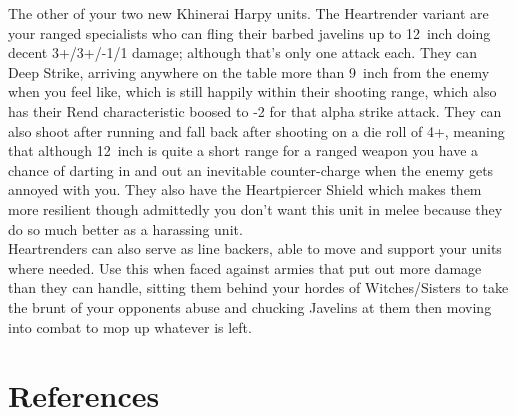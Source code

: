 The other of your two new Khinerai Harpy units. The Heartrender variant are
your ranged specialists who can fling their barbed javelins up to 12~inch doing
decent 3+/3+/-1/1 damage; although that's only one attack each.  They can Deep
Strike, arriving anywhere on the table more than 9~inch from the enemy when you
feel like, which is still happily within their shooting range, which also has
their Rend characteristic boosed to -2 for that alpha strike attack.  They can
also shoot after running and fall back after shooting on a die roll of 4+,
meaning that although 12~inch is quite a short range for a ranged weapon you
have a chance of darting in and out an inevitable counter-charge when the enemy
gets annoyed with you. They also have the Heartpiercer Shield which makes them
more resilient though admittedly you don't want this unit in melee because they
do so much better as a harassing unit. \\

Heartrenders can also serve as line backers, able to move and support your
units where needed. Use this when faced against armies that put out more
damage than they can handle, sitting them behind your hordes of
Witches/Sisters to take the brunt of your opponents abuse and chucking
Javelins at them then moving into combat to mop up whatever is left. \\





\section{References}
